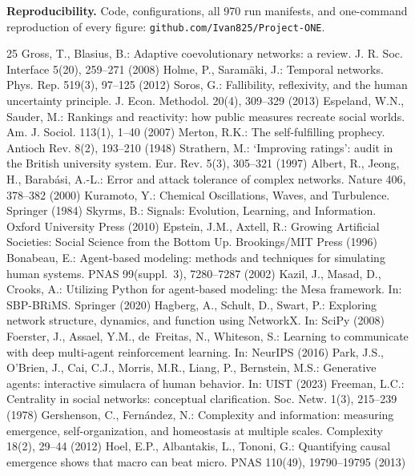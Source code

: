 \documentclass[10pt]{article}
\begin{document}
\medskip
\noindent\textbf{Reproducibility.} Code, configurations, all 970 run
manifests, and one-command reproduction of every figure:
\texttt{github.com/Ivan825/Project-ONE}.

\begin{thebibliography}{25}\footnotesize
{} Gross, T., Blasius, B.: Adaptive coevolutionary
networks: a review. J. R. Soc. Interface 5(20), 259--271 (2008)
 Holme, P., Saram\"aki, J.: Temporal networks.
Phys. Rep. 519(3), 97--125 (2012)
 Soros, G.: Fallibility, reflexivity, and the
human uncertainty principle. J. Econ. Methodol. 20(4), 309--329 (2013)
 Espeland, W.N., Sauder, M.: Rankings and
reactivity: how public measures recreate social worlds. Am. J. Sociol.
113(1), 1--40 (2007)
 Merton, R.K.: The self-fulfilling prophecy. Antioch
Rev. 8(2), 193--210 (1948)
 Strathern, M.: `Improving ratings': audit in
the British university system. Eur. Rev. 5(3), 305--321 (1997)
 Albert, R., Jeong, H., Barab\'asi, A.-L.: Error and
attack tolerance of complex networks. Nature 406, 378--382 (2000)
 Kuramoto, Y.: Chemical Oscillations, Waves,
and Turbulence. Springer (1984)
 Skyrms, B.: Signals: Evolution, Learning, and
Information. Oxford University Press (2010)
 Epstein, J.M., Axtell, R.: Growing Artificial
Societies: Social Science from the Bottom Up. Brookings/MIT Press (1996)
 Bonabeau, E.: Agent-based modeling: methods and
techniques for simulating human systems. PNAS 99(suppl.~3), 7280--7287 (2002)
 Kazil, J., Masad, D., Crooks, A.: Utilizing Python
for agent-based modeling: the Mesa framework. In: SBP-BRiMS. Springer (2020)
 Hagberg, A., Schult, D., Swart, P.: Exploring
network structure, dynamics, and function using NetworkX. In: SciPy (2008)
 Foerster, J., Assael, Y.M., de~Freitas, N.,
Whiteson, S.: Learning to communicate with deep multi-agent reinforcement
learning. In: NeurIPS (2016)
 Park, J.S., O'Brien, J., Cai, C.J., Morris,
M.R., Liang, P., Bernstein, M.S.: Generative agents: interactive simulacra of
human behavior. In: UIST (2023)
 Freeman, L.C.: Centrality in social networks:
conceptual clarification. Soc. Netw. 1(3), 215--239 (1978)
 Gershenson, C., Fern\'andez, N.:
Complexity and information: measuring emergence, self-organization, and
homeostasis at multiple scales. Complexity 18(2), 29--44 (2012)
 Hoel, E.P., Albantakis, L., Tononi, G.:
Quantifying causal emergence shows that macro can beat micro. PNAS 110(49),
19790--19795 (2013)
\end{thebibliography}
\end{document}
